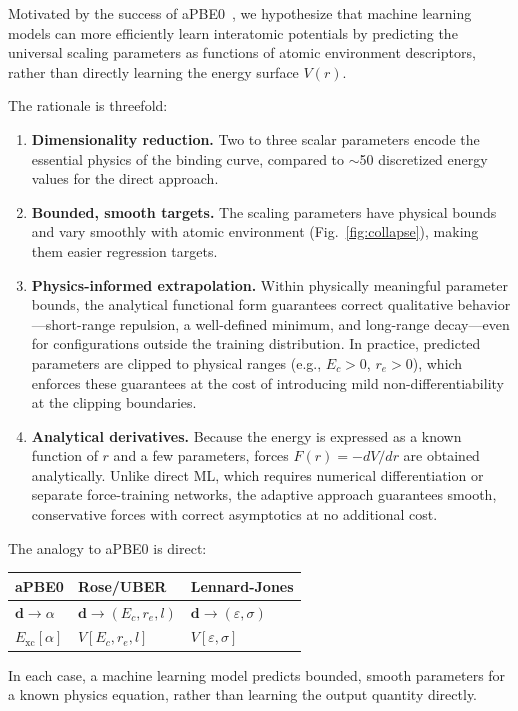 \documentclass[aps,prb,twocolumn,superscriptaddress,longbibliography,floatfix]{revtex4-2}
\begin{document}
Motivated by the success of aPBE0~\cite{Khan2025}, we hypothesize that machine learning models can more efficiently learn interatomic potentials by predicting the universal scaling parameters as functions of atomic environment descriptors, rather than directly learning the energy surface $V(r)$.

The rationale is threefold:
\begin{enumerate}
  \item \textbf{Dimensionality reduction.} Two to three scalar parameters encode the essential physics of the binding curve, compared to $\sim$50 discretized energy values for the direct approach.
  \item \textbf{Bounded, smooth targets.} The scaling parameters have physical bounds and vary smoothly with atomic environment (Fig.~\ref{fig:collapse}), making them easier regression targets.
  \item \textbf{Physics-informed extrapolation.} Within physically meaningful parameter bounds, the analytical functional form guarantees correct qualitative behavior---short-range repulsion, a well-defined minimum, and long-range decay---even for configurations outside the training distribution. In practice, predicted parameters are clipped to physical ranges (e.g., $E_c > 0$, $r_e > 0$), which enforces these guarantees at the cost of introducing mild non-differentiability at the clipping boundaries.
  \item \textbf{Analytical derivatives.} Because the energy is expressed as a known function of $r$ and a few parameters, forces $F(r) = -dV/dr$ are obtained analytically. Unlike direct ML, which requires numerical differentiation or separate force-training networks, the adaptive approach guarantees smooth, conservative forces with correct asymptotics at no additional cost.
\end{enumerate}

The analogy to aPBE0 is direct:
\begin{center}
\begin{tabular}{lll}
  \toprule
  aPBE0 & Rose/UBER & Lennard-Jones \\
  \midrule
  $\mathbf{d} \to \alpha$ & $\mathbf{d} \to (E_c, r_e, l)$ & $\mathbf{d} \to (\varepsilon, \sigma)$ \\
  $E_\mathrm{xc}[\alpha]$ & $V[E_c, r_e, l]$ & $V[\varepsilon, \sigma]$ \\
  \bottomrule
\end{tabular}
\end{center}
In each case, a machine learning model predicts bounded, smooth parameters for a known physics equation, rather than learning the output quantity directly.
\end{document}
